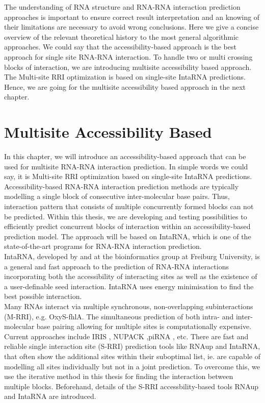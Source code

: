 \documentclass[twoside,a4paper]{report}
\numberwithin{equation}{section}
\begin{document}
	The understanding of RNA structure and RNA-RNA interaction prediction approaches 
	is important to ensure correct result interpretation and an knowing of their limitations are necessary to avoid wrong conclusions. Here we give a concise overview of the relevant theoretical history to the most general algorithmic approaches. We could say that the accessibility-based approach is the best approach for single site RNA-RNA interaction. To handle two or multi crossing blocks of interaction, we are introducing multisite accessibility based approach. The Multi-site RRI optimization is based on single-site IntaRNA predictions. Hence, we are going for the multisite accessibility based approach in the next chapter.\\

		
		
		
	\chapter{Multisite Accessibility Based  }
	
	In this chapter, we will introduce an accessibility-based approach that can be used for multisite RNA-RNA interaction prediction. In simple words we could say, it is Multi-site RRI optimization based on single-site IntaRNA predictions. Accessibility-based RNA-RNA interaction prediction methods are typically modelling a single block of consecutive inter-molecular base pairs. Thus, interaction pattern that consists of multiple concurrently formed blocks can not be predicted. Within this thesis, we are developing and testing possibilities to efficiently predict concurrent blocks of interaction within an accessibility-based prediction model. The approach will be based on IntaRNA, which is one of the state-of-the-art programs for RNA-RNA interaction prediction.\\
	
	IntaRNA, developed by \citep{busch2008intarna} and \citep{raden2018interactive} at the bioinformatics group at Freiburg University, is a general and fast approach to the prediction of RNA-RNA interactions incorporating both the accessibility of interacting sites as well as the existence of a user-definable seed interaction. IntaRNA uses energy minimisation to find the best possible interaction.  \\
	
	Many RNAs interact via multiple synchronous, non-overlapping subinteractions (M-RRI), e.g. OxyS-fhlA. The simultaneous prediction of both intra- and inter-molecular base pairing allowing for multiple sites is computationally expensive. Current approaches include IRIS \citep{pervouchine2004iris}, NUPACK \citep{dirks2007thermodynamic},piRNA \citep{chitsaz2009partition}, etc. There are fast and reliable single interaction site (S-RRI) prediction tools like RNAup and IntaRNA, that often show the additional sites within their suboptimal list, ie. are capable of modelling all sites individually but not in a joint prediction.	To overcome this, we use the iterative method in this thesis for finding the interaction between multiple blocks. Beforehand, details of the S-RRI accessbility-based tools RNAup and IntaRNA are introduced. \\
	
\end{document}
